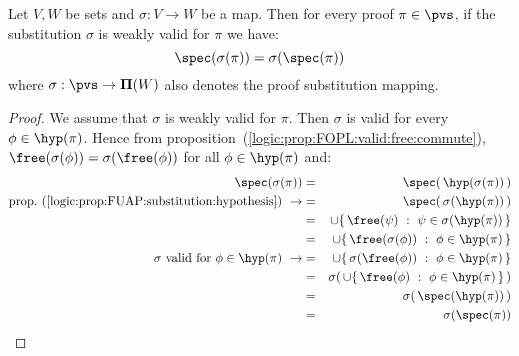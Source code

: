 \begin{prop}\label{logic:prop:FUAP:validsub:freevar}
Let $V, W$ be sets and $\sigma:V\to W$ be a map. Then for every
proof $\pi\in\pvs$, if  the substitution $\sigma$ is weakly valid
for $\pi$ we have:
    \[
    \spec(\sigma(\pi))=\sigma(\spec(\pi))
    \]
where $\sigma:\pvs\to{\bf\Pi}(W)$ also denotes the proof
substitution mapping.
\end{prop}
\begin{proof}
We assume that $\sigma$ is weakly valid for $\pi$. Then $\sigma$ is
valid for every $\phi\in\hyp(\pi)$. Hence from
proposition~(\ref{logic:prop:FOPL:valid:free:commute}),
$\free(\sigma(\phi))=\sigma(\free(\phi))$ for all $\phi\in\hyp(\pi)$
and:
    \begin{eqnarray*}
    \spec(\sigma(\pi))&=&\spec(\,\hyp(\sigma(\pi))\,)\\
    \mbox{prop.~(\ref{logic:prop:FUAP:substitution:hypothesis})}\ \rightarrow
    &=&\spec(\,\sigma(\hyp(\pi))\,)\\
    &=&\cup\{\,\free(\psi)\ :\ \psi\in\sigma(\hyp(\pi))\,\}\\
    &=&\cup\{\,\free(\sigma(\phi))\ :\ \phi\in\hyp(\pi)\,\}\\
    \mbox{$\sigma$ valid for $\phi\in\hyp(\pi)$}\ \rightarrow
    &=&\cup\{\,\sigma(\free(\phi))\ :\ \phi\in\hyp(\pi)\,\}\\
    &=&\sigma(\,\cup\{\,\free(\phi)\ :\ \phi\in\hyp(\pi)\,\}\,)\\
    &=&\sigma(\,\spec(\hyp(\pi))\,)\\
    &=&\sigma(\spec(\pi))
    \end{eqnarray*}
\end{proof}


